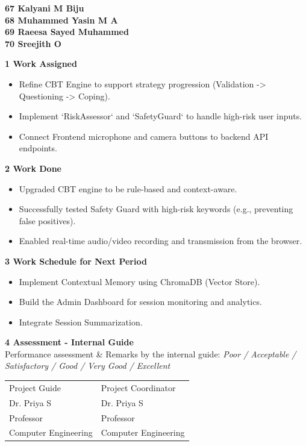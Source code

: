 \documentclass[12pt,a4paper]{article}
\begin{document}
\begin{center}
\textbf{67  Kalyani M Biju\\
68 Muhammed Yasin M A\\
69 Raeesa Sayed Muhammed\\
70 Sreejith O\\[1.5em]}
\end{center}

\noindent\textbf{1 \quad Work Assigned}
\begin{itemize}
    \item Refine CBT Engine to support strategy progression (Validation -> Questioning -> Coping).
    \item Implement `RiskAssessor` and `SafetyGuard` to handle high-risk user inputs.
    \item Connect Frontend microphone and camera buttons to backend API endpoints.
\end{itemize}

\noindent\textbf{2 \quad Work Done}
\begin{itemize}
    \item Upgraded CBT engine to be rule-based and context-aware.
    \item Successfully tested Safety Guard with high-risk keywords (e.g., preventing false positives).
    \item Enabled real-time audio/video recording and transmission from the browser.
\end{itemize}

\noindent\textbf{3 \quad Work Schedule for Next Period}
\begin{itemize}
    \item Implement Contextual Memory using ChromaDB (Vector Store).
    \item Build the Admin Dashboard for session monitoring and analytics.
    \item Integrate Session Summarization.
\end{itemize}


\noindent\textbf{4 \quad Assessment - Internal Guide}\\[0.5em]
Performance assessment \& Remarks by the internal guide: \textit{Poor / Acceptable /}\\
\textit{Satisfactory / Good / Very Good / Excellent}\\[3em]

\noindent
\begin{tabular}{p{} p{}}
Project Guide & Project Coordinator\\[0.5em]
Dr. Priya S & Dr. Priya S\\
Professor & Professor\\
Computer Engineering & Computer Engineering\\
\end{tabular}
\end{document}
